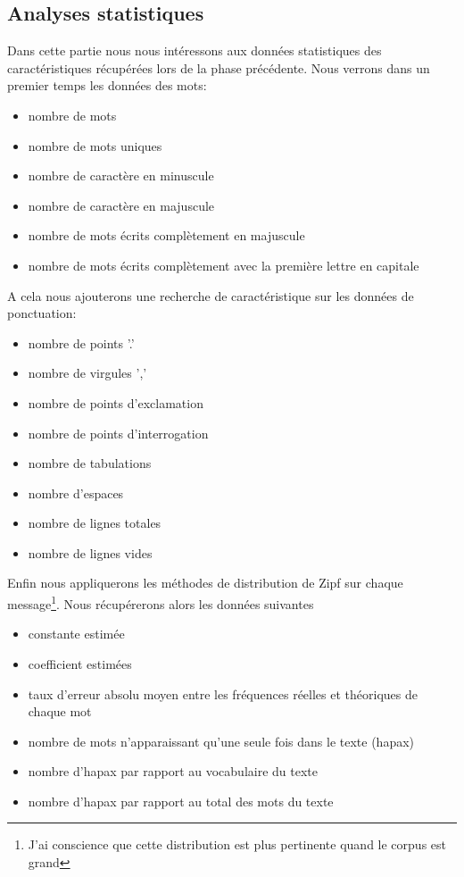 \documentclass[a4paper,12pt]{article}
\begin{document}
	\subsection{Analyses statistiques}
		Dans cette partie nous nous intéressons aux données statistiques des caractéristiques récupérées lors de la phase précédente. 
		Nous verrons dans un premier temps les données des mots:
		\begin{itemize}
			\item nombre de mots
			\item nombre de mots uniques
			\item nombre de caractère en minuscule
			\item nombre de caractère en majuscule
			\item nombre de mots écrits complètement en majuscule
			\item nombre de mots écrits complètement avec la première lettre en capitale
		\end{itemize}
		A cela nous ajouterons une recherche de caractéristique sur les données de ponctuation:
		\begin{itemize}
			\item nombre de points '.'
			\item nombre de virgules ','
			\item nombre de points d'exclamation
			\item nombre de points d'interrogation
			\item nombre de tabulations
			\item nombre d'espaces
			\item nombre de lignes totales
			\item nombre de lignes vides
		\end{itemize}
		Enfin nous appliquerons les méthodes de distribution de Zipf sur chaque message\footnote{J'ai conscience que cette distribution est plus pertinente quand le corpus est grand}. Nous récupérerons alors les données suivantes
		\begin{itemize}
			\item constante estimée
			\item coefficient estimées
			\item taux d'erreur absolu moyen entre les fréquences réelles et théoriques de chaque mot
			\item nombre de mots n'apparaissant qu'une seule fois dans le texte (hapax)
			\item nombre d'hapax par rapport au vocabulaire du texte
			\item nombre d'hapax par rapport au total des mots du texte
		\end{itemize}
		
\end{document}
